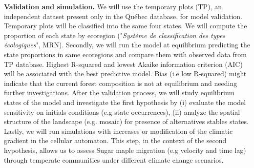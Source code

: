 \textbf{Validation and simulation.} We will use the temporary plots (TP), an independent 
dataset present only in the Québec database, for model validation. Temporary plots will
be classified into the same four states. We will compute the proportion
of each state by ecoregion ("\textit{Système de classification des types
écologiques}", MRN). Secondly, we will run the model at equilibrium predicting
the state proportions in same ecoregions and compare them with observed data
from TP database. Highest R-squared and lowest Akaike information criterion
(AIC) will be associated with the best predictive model. 
Bias (i.e low
R-squared) might indicate that the current forest composition is not at
equilibrium and needing further investigations. After the validation process,
we will study equilibrium states of the model and investigate the first
hypothesis by (i) evaluate the model sensitivity on initials conditions (e.g
state occurrences), (ii) analyze the spatial structure of the landscape (e.g.
mosaic) for presence of alternatives stables states. Lastly, we will run
simulations with increases or modification of the climatic gradient in the
cellular automaton. This step, in the context of the second hypothesis, allows us to
assess Sugar maple migration (e.g velocity and time lag) through 
temperate communities under different climate change scenarios.


\clearpage
\small

